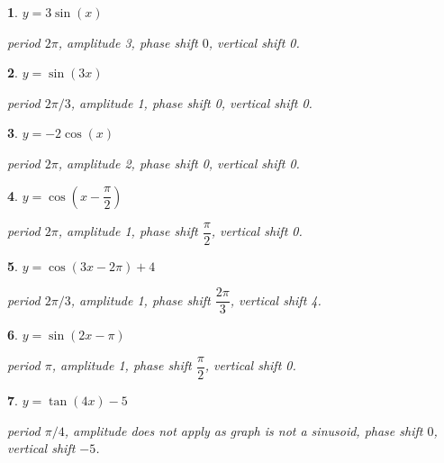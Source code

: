 \documentclass{amsbook}
\newtheorem{exc}{}
\newenvironment{ex}{\begin{exc}\normalfont}{\end{exc}}
\numberwithin{section}{chapter}
\numberwithin{equation}{chapter}
\begin{document}
\begin{multicols}{2}
	\begin{ex}
		$y = 3\sin(x)$
			\begin{sol}
			period $2\pi$, amplitude 3, phase shift $0$, vertical shift 0.
		\end{sol}
	\end{ex}

	\begin{ex}
	$y = \sin(3x)$
	\begin{sol}
		period $2\pi/3$, amplitude 1, phase shift 0, vertical shift 0.
	\end{sol}
\end{ex}

\begin{ex}
	$y = -2\cos(x)$
	\begin{sol}
		period $2\pi$, amplitude 2, phase shift 0, vertical shift 0.
	\end{sol}
\end{ex}


\begin{ex}
	$y = \cos\left(x - \dfrac{\pi}{2} \right)$
	\begin{sol}
		period $2\pi$, amplitude 1, phase shift $\dfrac{\pi}{2}$, vertical shift 0.
	\end{sol}
\end{ex}


\begin{ex}
	$y = \cos\left(3x - 2\pi \right)+4$
	\begin{sol}
		period $2\pi/3$, amplitude 1, phase shift $\dfrac{2\pi}{3}$, vertical shift 4.
	\end{sol}
\end{ex}


\begin{ex}
	$y = \sin\left(2x - \pi \right)$
	\begin{sol}
		period $\pi$, amplitude 1, phase shift $\dfrac{\pi}{2}$, vertical shift 0.
	\end{sol}
\end{ex}

\begin{ex}
	$y = \tan\left(4x\right)-5$
	\begin{sol}
		period $\pi/4$, amplitude does not apply as graph is not a sinusoid, phase shift $0$, vertical shift $-5$.
	\end{sol}
\end{ex}


\end{multicols}
\end{document}
